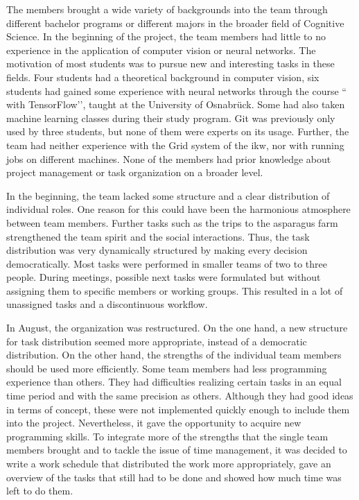 The members brought a wide variety of backgrounds into the team through different bachelor programs or different majors in the broader field of Cognitive Science. In the beginning of the project, the team members had little to no experience in the application of computer vision or neural networks. The motivation of most students was to pursue new and interesting tasks in these fields. Four students had a theoretical background in computer vision, six students had gained some experience with neural networks through the course `` with TensorFlow’’, taught at the University of Osnabr{\"u}ck. Some had also taken machine learning classes during their study program. Git was previously only used by three students, but none of them were experts on its usage. Further, the team had neither experience with the Grid system of the \acrshort{ikw}, nor with running jobs on different machines. None of the members had prior knowledge about project management or task organization on a broader level.

\bigskip
In the beginning, the team lacked some structure and a clear distribution of individual roles. One reason for this could have been the harmonious atmosphere between team members. Further tasks such as the trips to the asparagus farm strengthened the team spirit and the social interactions. Thus, the task distribution was  very dynamically structured by making every decision democratically. Most tasks were performed in smaller teams of two to three people.  During meetings, possible next tasks were formulated but  without assigning them to specific members or working groups. This resulted in a lot of unassigned tasks and a discontinuous workflow. 

In August, the organization was restructured. On the one hand, a new structure for task distribution seemed more appropriate, instead of a democratic distribution. On the other hand, the strengths of the individual team members should be used more efficiently. Some team members had less programming experience than others. They had difficulties realizing certain tasks in an equal time period and with the same precision as others. Although they had good ideas in terms of concept, these were not implemented quickly enough to include them into the project. Nevertheless, it gave the opportunity to acquire new programming skills. To integrate more of the strengths that the single team members brought and to tackle the issue of time management, it was decided to write a work schedule that distributed the work more appropriately, gave an overview of the tasks that still had to be done and showed how much time was left to do them.


